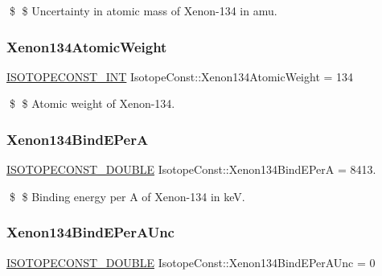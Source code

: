 \$ \$ Uncertainty in atomic mass of Xenon-\/134 in amu. \mbox{\label{group___isotope_const-_xenon-_xe134_gae8c80d7171e20a3effcfe5137f04a728}} 
\subsubsection{\texorpdfstring{Xenon134\+Atomic\+Weight}{Xenon134AtomicWeight}}
{\footnotesize\ttfamily \mbox{\hyperlink{group___isotope_const-_macros_ga5f18360b3e99483a35c32d789e62621c}{I\+S\+O\+T\+O\+P\+E\+C\+O\+N\+S\+T\+\_\+\+I\+NT}} Isotope\+Const\+::\+Xenon134\+Atomic\+Weight = 134}

\$ \$ Atomic weight of Xenon-\/134. \mbox{\label{group___isotope_const-_xenon-_xe134_ga95e8a2681648706264fa93404b28fbb4}} 
\subsubsection{\texorpdfstring{Xenon134\+Bind\+E\+PerA}{Xenon134BindEPerA}}
{\footnotesize\ttfamily \mbox{\hyperlink{group___isotope_const-_macros_ga8f45a7272ce02c0b4c65c44636ed719a}{I\+S\+O\+T\+O\+P\+E\+C\+O\+N\+S\+T\+\_\+\+D\+O\+U\+B\+LE}} Isotope\+Const\+::\+Xenon134\+Bind\+E\+PerA = 8413.}

\$ \$ Binding energy per A of Xenon-\/134 in keV. \mbox{\label{group___isotope_const-_xenon-_xe134_ga2f184774cd9291cd9e9d722cb2a08ef1}} 
\subsubsection{\texorpdfstring{Xenon134\+Bind\+E\+Per\+A\+Unc}{Xenon134BindEPerAUnc}}
{\footnotesize\ttfamily \mbox{\hyperlink{group___isotope_const-_macros_ga8f45a7272ce02c0b4c65c44636ed719a}{I\+S\+O\+T\+O\+P\+E\+C\+O\+N\+S\+T\+\_\+\+D\+O\+U\+B\+LE}} Isotope\+Const\+::\+Xenon134\+Bind\+E\+Per\+A\+Unc = 0}

